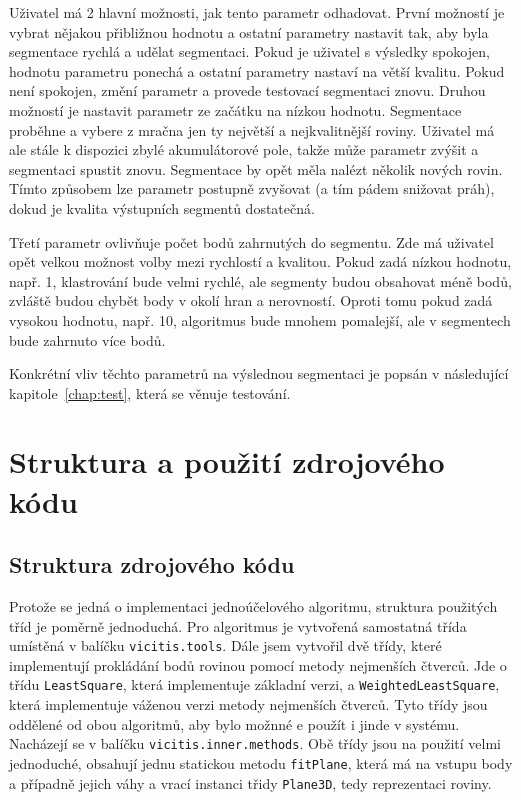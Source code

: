 \documentclass[11pt,twoside,a4paper]{book}
\begin{document}
Uživatel má 2 hlavní možnosti, jak tento parametr odhadovat. První možností je vybrat nějakou přibližnou hodnotu a ostatní parametry nastavit tak, aby byla segmentace rychlá a udělat  segmentaci. Pokud je uživatel s výsledky spokojen, hodnotu parametru ponechá a ostatní parametry nastaví na větší kvalitu. Pokud není spokojen, změní parametr a provede testovací segmentaci znovu. Druhou možností je nastavit parametr ze začátku na nízkou hodnotu. Segmentace proběhne a vybere z mračna jen ty největší a nejkvalitnější roviny. Uživatel má ale stále k dispozici zbylé akumulátorové pole, takže může parametr zvýšit a segmentaci spustit znovu. Segmentace by opět měla nalézt několik nových rovin. Tímto způsobem lze parametr postupně zvyšovat (a tím pádem snižovat práh), dokud je kvalita výstupních segmentů dostatečná.

Třetí parametr ovlivňuje počet bodů zahrnutých do segmentu. Zde má uživatel opět velkou možnost volby mezi rychlostí a kvalitou. Pokud zadá nízkou hodnotu, např. 1, klastrování bude velmi rychlé, ale segmenty budou obsahovat méně bodů, zvláště budou chybět body v okolí hran a nerovností. Oproti tomu pokud zadá vysokou hodnotu, např. 10, algoritmus bude mnohem pomalejší, ale v segmentech bude zahrnuto více bodů.

Konkrétní vliv těchto parametrů na výslednou segmentaci je popsán v následující kapitole~\ref{chap:test}, která se věnuje testování.

\section{Struktura a použití zdrojového kódu}


\subsection{Struktura zdrojového kódu}

Protože se jedná o implementaci jednoúčelového algoritmu, struktura použitých tříd je poměrně jednoduchá. Pro  algoritmus je vytvořená samostatná třída umístěná v balíčku \verb|vicitis.tools|. Dále jsem vytvořil dvě třídy, které implementují prokládání bodů rovinou pomocí metody nejmenších čtverců. Jde o třídu \verb|LeastSquare|, která implementuje základní verzi, a \verb|WeightedLeastSquare|, která implementuje váženou verzi metody nejmenších čtverců. Tyto třídy jsou oddělené od obou algoritmů, aby bylo možnné e použít i jinde v systému. Nacházejí se v balíčku \verb|vicitis.inner.methods|. Obě třídy jsou na použití velmi jednoduché, obsahují jednu statickou metodu \verb|fitPlane|, která má na vstupu body a případně jejich váhy a vrací instanci třidy \verb|Plane3D|, tedy reprezentaci roviny.
\end{document}
